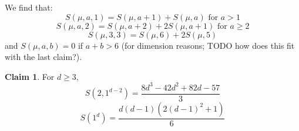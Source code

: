 \documentclass[11pt]{article}           %
\theoremstyle{definition}
\newtheorem*{claim}{Claim}
\theoremstyle{definition}
\begin{document}
We find that:
\[
S(\mu,a,1)=S(\mu,a+1)+S(\mu,a)\text{ for $a>1$}
\]
\[
S(\mu,a,2)=S(\mu,a+2)+2S(\mu,a+1)\text{ for $a\geq 2$}
\]
\[
S(\mu,3,3)=S(\mu,6)+2S(\mu,5)
\]
and $S(\mu,a,b)=0$ if $a+b>6$ (for dimension reasons; TODO how does this fit with the last claim?).

\begin{claim}
  For $d\geq 3$,
  \[
  S(2,1^{d-2})=\frac{8d^3-42d^2+82d-57}{3}
  \]
  \[
  S(1^d)=\frac{d(d-1)(2(d-1)^2+1)}{6}
  \]
  \end{claim}
\end{document}

